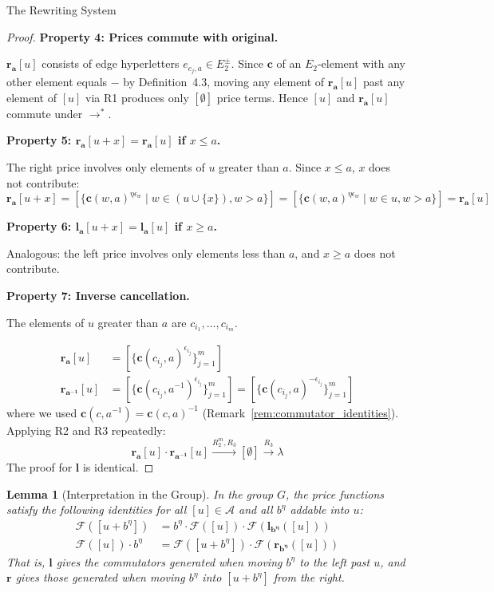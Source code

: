 \documentclass{article}
\newtheorem{lemma}[theorem]{Lemma}
\theoremstyle{definition}
\theoremstyle{remark}
\theoremstyle{theorem}
\theoremstyle{definition}
\begin{document}
\begin{section}{The Rewriting System}
\begin{proof}
\textbf{Property 4: Prices commute with original.}

$\mathbf{r_a}[u]$ consists of edge hyperletters $e_{c_j,a} \in E_2^\pm$. Since $\mathbf{c}$ of an $E_2$-element with any other element equals $-$ by Definition~4.3, moving any element of $\mathbf{r_a}[u]$ past any element of $[u]$ via R1 produces only $[\emptyset]$ price terms. Hence $[u]$ and $\mathbf{r_a}[u]$ commute under $\to^*$.

\textbf{Property 5: $\mathbf{r_a}[u+x] = \mathbf{r_a}[u]$ if $x \leq a$.}

The right price involves only elements of $u$ greater than $a$. Since $x \leq a$, $x$ does not contribute:
$$\mathbf{r_a}[u+x] = [\{\mathbf{c}(w,a)^{\eta\epsilon_w} \mid w \in (u \cup \{x\}), w > a\}] = [\{\mathbf{c}(w,a)^{\eta\epsilon_w} \mid w \in u, w > a\}] = \mathbf{r_a}[u]$$

\textbf{Property 6: $\mathbf{l_a}[u+x] = \mathbf{l_a}[u]$ if $x \geq a$.}

Analogous: the left price involves only elements less than $a$, and $x \geq a$ does not contribute.

\textbf{Property 7: Inverse cancellation.}

The elements of $u$ greater than $a$ are $c_{i_1}, \ldots, c_{i_m}$.

\begin{align*}
\mathbf{r_a}[u] &= [\{\mathbf{c}(c_{i_j}, a)^{\epsilon_{i_j}}\}_{j=1}^m]\\
\mathbf{r_{a^{-1}}}[u] &= [\{\mathbf{c}(c_{i_j}, a^{-1})^{\epsilon_{i_j}}\}_{j=1}^m] = [\{\mathbf{c}(c_{i_j}, a)^{-\epsilon_{i_j}}\}_{j=1}^m]
\end{align*}
where we used $\mathbf{c}(c, a^{-1}) = \mathbf{c}(c,a)^{-1}$ (Remark~\ref{rem:commutator_identities}). Applying R2 and R3 repeatedly:
$$\mathbf{r_a}[u] \cdot \mathbf{r_{a^{-1}}}[u] \xrightarrow{R_2^m, R_3} [\emptyset] \xrightarrow{R_3}\lambda$$
The proof for $\mathbf{l}$ is identical.
\end{proof}

\begin{lemma}[Interpretation in the Group]\label{lem:interpretation}
In the group $G$, the price functions satisfy the following identities for
all $[u] \in \mathcal{A}$ and all $b^\eta$ addable into $u$:
\begin{align}
\mathcal{F}([u + b^{\eta}]) &= b^{\eta} \cdot \mathcal{F}([u]) \cdot \mathcal{F}(\mathbf{l_{b^{\eta}}}([u])) \label{eq:left_id}\\
\mathcal{F}([u]) \cdot b^{\eta} &= \mathcal{F}([u + b^{\eta}]) \cdot \mathcal{F}(\mathbf{r_{b^{\eta}}}([u])) \label{eq:right_id}
\end{align}
That is, $\mathbf{l}$ gives the commutators generated when moving $b^{\eta}$
to the left past $u$, and $\mathbf{r}$ gives those generated when moving
$b^\eta$ into $[u+b^\eta]$ from the right.
\end{lemma}


\end{section}
\end{document}
